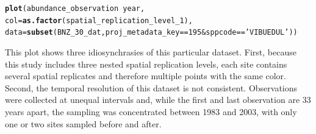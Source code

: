 \documentclass{article}\usepackage[]{graphicx}\usepackage[]{color}
\makeatletter
\newcommand{\hlnum}[1]{\textcolor[rgb]{0.686,0.059,0.569}{#1}}%
\newcommand{\hlstr}[1]{\textcolor[rgb]{0.192,0.494,0.8}{#1}}%
\newcommand{\hlopt}[1]{\textcolor[rgb]{0,0,0}{#1}}%
\newcommand{\hlstd}[1]{\textcolor[rgb]{0.345,0.345,0.345}{#1}}%
\newcommand{\hlkwc}[1]{\textcolor[rgb]{0.333,0.667,0.333}{#1}}%
\newcommand{\hlkwd}[1]{\textcolor[rgb]{0.737,0.353,0.396}{\textbf{#1}}}%
\newenvironment{kframe}{%
 \def\at@end@of@kframe{}%
 \ifinner\ifhmode%
  \def\at@end@of@kframe{\end{minipage}}%
  \begin{minipage}{\columnwidth}%
 \fi\fi%
 \def\FrameCommand##1{\hskip\@totalleftmargin \hskip-\fboxsep
 \colorbox{shadecolor}{##1}\hskip-\fboxsep
     \hskip-\linewidth \hskip-\@totalleftmargin \hskip\columnwidth}%
 \MakeFramed {\advance\hsize-\width
   \@totalleftmargin\z@ \linewidth\hsize
   \@setminipage}}%
 {\par\unskip\endMakeFramed%
 \at@end@of@kframe}
\newenvironment{knitrout}{}{} %
\newcommand{\tom}[1]{{\textit{\color{red}{[#1]}}}}
\makeatother
\begin{document}
\begin{knitrout}
\color{fgcolor}\begin{kframe}
\begin{alltt}
\hlkwd{plot}\hlstd{(abundance_observation} \hlopt{~} \hlstd{year,}
     \hlkwc{col} \hlstd{=} \hlkwd{as.factor}\hlstd{(spatial_replication_level_1),}
     \hlkwc{data} \hlstd{=} \hlkwd{subset}\hlstd{(BNZ_30_dat, proj_metadata_key} \hlopt{==} \hlnum{195} \hlopt{&} \hlstd{sppcode} \hlopt{==} \hlstr{'VIBUEDUL'}\hlstd{) )}
\end{alltt}
\end{kframe}
\end{knitrout}
This plot shows three idiosynchrasies of this particular dataset. First, because this study includes three nested spatial replication levels, each site contains several spatial replicates and therefore multiple points with the same color. Second, the temporal resolution of this dataset is not consistent. Observations were collected at unequal intervals and, while the first and last observation are 33 years apart, the sampling was concentrated between 1983 and 2003, with only one or two sites sampled before and after. \tom{It would be nice to take this example a little further, drawing on the online study description - the type of digging one would have to do to really understand the data. For example, the abundance observation is a count, but per what sampling unit? Are these counts in a plot, counts on a transect, etc? We can't tell just from popler but we can probably get that information by reading the study design. It would be good to add something to this effect.}
\end{document}
